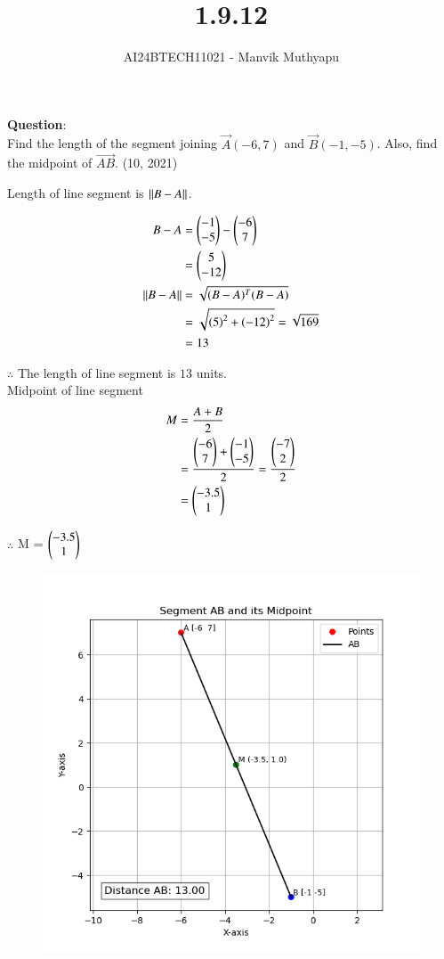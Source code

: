 \documentclass[journal,12pt,onecolumn]{IEEEtran}
\title{1.9.12}
\author{AI24BTECH11021 - Manvik Muthyapu}
\theoremstyle{remark}
\begin{document}


\maketitle
\bigskip

\renewcommand{\thefigure}{\theenumi}
\renewcommand{\thetable}{\theenumi}


\textbf{Question}:\\

Find the length of the segment joining $\vec{A}(-6, 7)$ and $\vec{B}(-1, -5)$. Also, find the midpoint of $\vec{AB}$.
\hfill (10, 2021)\\

\solution

\begin{table}[h!]    
  \centering
  
  \label{tab 1.8.18}
\end{table}

Length of line segment is $\left\lVert B-A\right\rVert$.

\begin{align}
	B-A &= \begin{pmatrix}-1\\-5\end{pmatrix}-\begin{pmatrix}-6\\7\end{pmatrix}\\
            &= \begin{pmatrix}5\\-12\end{pmatrix}\\
	\left\lVert B-A\right\rVert &= \sqrt{(B-A)^{T}(B-A)}\\
	&=\sqrt{\left(5\right)^{2} + \left(-12\right)^{2}} = \sqrt{169}\\
	    &= 13 
\end{align}

$\therefore$ The length of line segment is $13$ units.\\

Midpoint of line segment 
\begin{align}
	M &= \frac{A+B}{2}\\
	  &= \frac{\begin{pmatrix}-6\\7\end{pmatrix} + \begin{pmatrix}-1\\-5\end{pmatrix}}{2} = \frac{\begin{pmatrix}-7\\2\end{pmatrix}}{2}\\
	  &= \begin{pmatrix}-3.5\\1\end{pmatrix}
\end{align}

		$\therefore$ M = $\begin{pmatrix}-3.5\\1\end{pmatrix}$


\begin{figure}[h!]
	\centering
	\includegraphics[width=0.7\linewidth]{figs/plot.png}
\end{figure}
\end{document}
